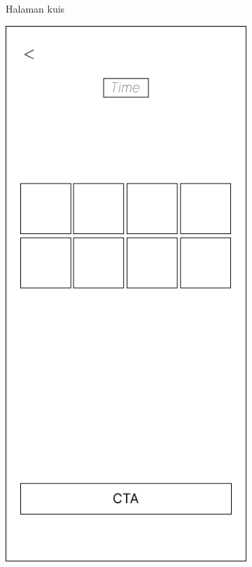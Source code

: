\begin{figure}[H]
\begin{subfigure}[b]{0.3\textwidth}
	  \caption{Halaman kuis}
	  \label{fig:ActivityKuis}
	\end{subfigure}
	\begin{subfigure}[b]{0.3\textwidth}
		\centering
	  \includegraphics[width=\linewidth]{contents/chapter-3/images/MF-kuis-4.png}

\end{subfigure}
\end{figure}
